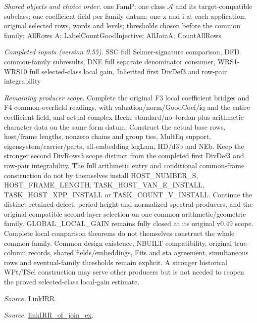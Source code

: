\documentclass[11pt,a4paper]{article}
\numberwithin{equation}{section}
\theoremstyle{remark}\newtheorem{remark}[theorem]{Remark}
\begin{document}
\emph{Shared objects and choice order.} one FamP; one class $\mathcal A$ and its target-compatible subclass; one coefficient field per family datum; one x and i at each application; original selected rows, words and levels; thresholds chosen before the common family; AllRows A; LabelCountGoodInjective; AllJoinA; CountAllRows

\emph{Completed inputs (version 0.55).} SSC full Selmer-signature comparison, DFD common-family subresults, DNE full separate denominator consumer, WRS1-WRS10 full selected-class local gain, Inherited first DivDef3 and row-pair integrability

\emph{Remaining producer scope.} Complete the original F3 local coefficient bridges and F4 common-overfield readings, with valuation/norm/GoodCoef/iq and the entire coefficient field, and actual complex Hecke standard/no-Jordan plus arithmetic character data on the same form datum. Construct the actual base rows, host/frame lengths, nonzero chains and group ties, MultEq support, eigensystem/carrier/parts, all-embedding logLam, HD/d3b and NEb. Keep the stronger second DivRows3 scope distinct from the completed first DivDef3 and row-pair integrability. The full arithmetic entry and conditional common-frame construction do not by themselves install HOST\_\allowbreak NUMBER\_\allowbreak S, HOST\_\allowbreak FRAME\_\allowbreak LENGTH, TASK\_\allowbreak HOST\_\allowbreak VAN\_\allowbreak E\_\allowbreak INSTALL, TASK\_\allowbreak HOST\_\allowbreak XPP\_\allowbreak INSTALL or TASK\_\allowbreak COUNT\_\allowbreak V\_\allowbreak INSTALL. Continue the distinct retained-defect, period-height and normalized spectral producers, and the original compatible second-layer selection on one common arithmetic/geometric family. GLOBAL\_\allowbreak LOCAL\_\allowbreak GAIN remains fully closed at its original v0.49 scope. Complete local comparison theorems do not themselves construct the whole common family. Common design existence, NBUILT compatibility, original true-column records, shared fields/embeddings, Fits and eta agreement, simultaneous rows and eventual-family thresholds remain explicit. A stronger historical WPt/TSel construction may serve other producers but is not needed to reopen the proved selected-class local-gain estimate.

\emph{Source.} \href{https://github.com/CocoSgt/riemann-hypothesis-lean/blob/7cbf7a0c32fca1badf05931879a37c3f8a2b03b4/src/Formalism/SharpRestriction/GlobalTheoremInputs.lean#L55-L58}{LinkIRR}.

\emph{Source.} \href{https://github.com/CocoSgt/riemann-hypothesis-lean/blob/7cbf7a0c32fca1badf05931879a37c3f8a2b03b4/src/Development/AbelianVarietyTheory/Proofs/GlobalInterpolation/LinkIRROfJoinEx.lean#L17-L38}{linkIRR\_\allowbreak of\_\allowbreak join\_\allowbreak ex}.
\end{document}
